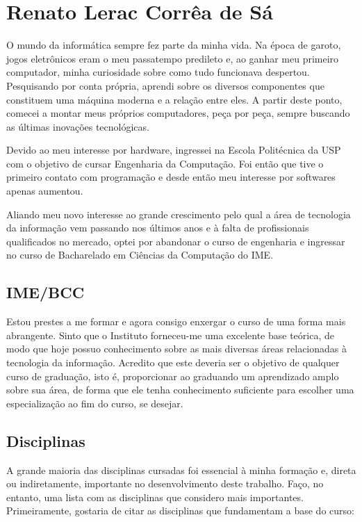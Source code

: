 \newpage
\section{Renato Lerac Corrêa de Sá}
\label{sec:renato_subjetiva}

O mundo da informática sempre fez parte da minha vida. Na época de garoto, jogos eletrônicos eram o
meu passatempo predileto e, ao ganhar meu primeiro computador, minha curiosidade sobre como tudo
funcionava despertou. Pesquisando por conta própria, aprendi sobre os diversos componentes que
constituem uma máquina moderna e a relação entre eles. A partir deste ponto, comecei a montar meus
próprios computadores, peça por peça, sempre buscando as últimas inovações tecnológicas.

Devido ao meu interesse por hardware, ingressei na Escola Politécnica da USP com o objetivo de
cursar Engenharia da Computação. Foi então que tive o primeiro contato com programação e desde então
meu interesse por softwares apenas aumentou.

Aliando meu novo interesse ao grande crescimento pelo qual a área de tecnologia da informação
vem passando nos últimos anos e à falta de profissionais qualificados no mercado, optei por
abandonar o curso de engenharia e ingressar no curso de Bacharelado em Ciências da Computação do
IME.

\subsection{IME/BCC}

Estou prestes a me formar e agora consigo enxergar o curso de uma forma mais abrangente. Sinto que o
Instituto forneceu-me uma excelente base teórica, de modo que hoje possuo conhecimento sobre as mais
diversas áreas relacionadas à tecnologia da informação. Acredito que este deveria ser o objetivo de
qualquer curso de graduação, isto é, proporcionar ao graduando um aprendizado amplo sobre sua área,
de forma que ele tenha conhecimento suficiente para escolher uma especialização ao fim do curso, se
desejar.

\subsection{Disciplinas}

A grande maioria das disciplinas cursadas foi essencial à minha formação e, direta ou
indiretamente, importante no desenvolvimento deste trabalho. Faço, no entanto, uma lista
com as disciplinas que considero mais importantes. Primeiramente, gostaria de citar as disciplinas
que fundamentam a base do curso:

